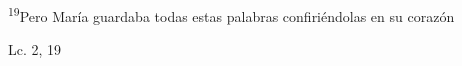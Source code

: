 \documentclass[../../rosario.tex]{subfiles}
\begin{document}
    \textsuperscript{19}Pero María guardaba todas estas palabras confiriéndolas en su corazón
    \begin{flushright}
    Lc. 2, 19        
    \end{flushright}
\end{document}
